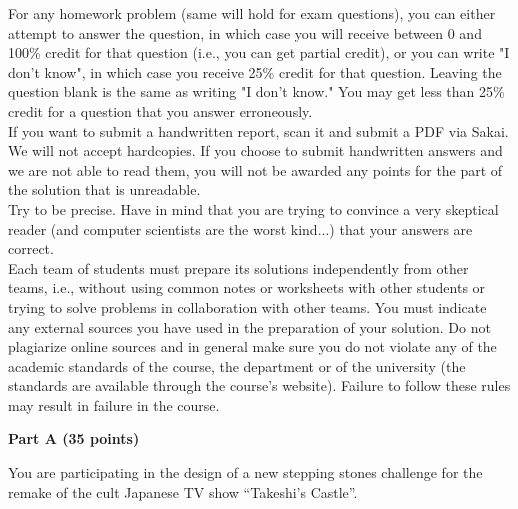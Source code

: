 \documentclass{article}
\begin{document}
 For any homework problem (same will hold
for exam questions), you can either attempt to answer the question, in
which case you will receive between 0 and 100\% credit for that
question (i.e., you can get partial credit), or you can write "I don't
know", in which case you receive 25\% credit for that question.
Leaving the question blank is the same as writing "I don't know." You
may get less than 25\% credit for a question that you answer
erroneously.\\

 If you want to submit a
handwritten report, scan it and submit a PDF via Sakai. We will not
accept hardcopies. If you choose to submit handwritten answers and we
are not able to read them, you will not be awarded any points for the
part of the solution that is unreadable.\\

 Try to be precise. Have in mind that you
are trying to convince a very skeptical reader (and computer
scientists are the worst kind...) that your answers are correct.\\

 Each team of students
must prepare its solutions independently from other teams, i.e.,
without using common notes or worksheets with other students or trying
to solve problems in collaboration with other teams.  You must
indicate any external sources you have used in the preparation of your
solution. Do not plagiarize online sources and in general make sure
you do not violate any of the academic standards of the course, the
department or of the university (the standards are available through
the course's website). Failure to follow these rules may result in
failure in the course.\\

\newpage

\vspace{0.1in}

{\bf }

\begin{center}
{\bf Part A (35 points)}
\end{center}

 You are participating in the design of a
new stepping stones challenge for the remake of the cult Japanese TV
show ``Takeshi's Castle''.\\
\end{document}
